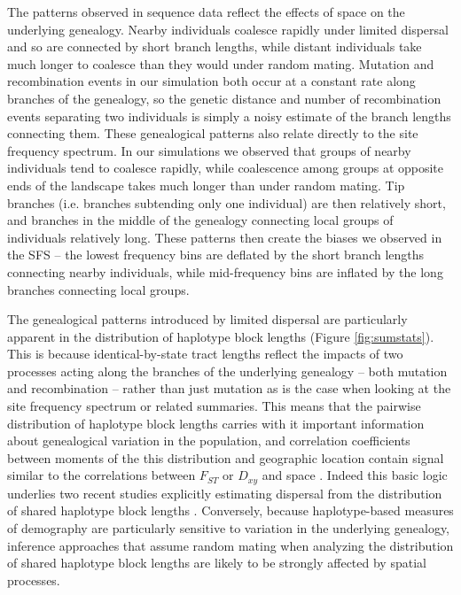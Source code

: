 \documentclass[11pt,twoside,lineno]{preprint}
\begin{document}
The patterns observed in sequence data reflect the effects of space on the underlying genealogy. Nearby individuals coalesce rapidly under limited dispersal and so are connected by short branch lengths, while distant individuals take much longer to coalesce than they would under random mating. Mutation and recombination events in our simulation both occur at a constant rate along branches of the genealogy, so the genetic distance and number of recombination events separating two individuals is simply a noisy estimate of the branch lengths connecting them. These genealogical patterns also relate directly to the site frequency spectrum. In our simulations we observed that groups of nearby individuals tend to coalesce rapidly, while coalescence among groups at opposite ends of the landscape takes much longer than under random mating. Tip branches (i.e. branches subtending only one individual) are then relatively short, and branches in the middle of the genealogy connecting local groups of individuals relatively long. These patterns then create the biases we observed in the SFS -- the lowest frequency bins are deflated by the short branch lengths connecting nearby individuals, while mid-frequency bins are inflated by the long branches connecting local groups. 

The genealogical patterns introduced by limited dispersal are particularly apparent in the distribution of haplotype block lengths (Figure \ref{fig:sumstats}). This is because identical-by-state tract lengths reflect the impacts of two processes acting along the branches of the underlying genealogy -- both mutation and recombination -- rather than just mutation as is the case when looking at the site frequency spectrum or related summaries. This means that the pairwise distribution of haplotype block lengths carries with it important information about genealogical variation in the population, and correlation coefficients between moments of the this distribution and geographic location contain signal similar to the correlations between $F_{ST}$ or $D_{xy}$ and space \citep{Rousset1997}. Indeed this basic logic underlies two recent studies explicitly estimating dispersal from the distribution of shared haplotype block lengths \citep{Ringbauer2017,Baharian2016}. Conversely, because haplotype-based measures of demography are particularly sensitive to variation in the underlying genealogy, inference approaches that assume random mating when analyzing the distribution of shared haplotype block lengths are likely to be strongly affected by spatial processes. 
\end{document}

